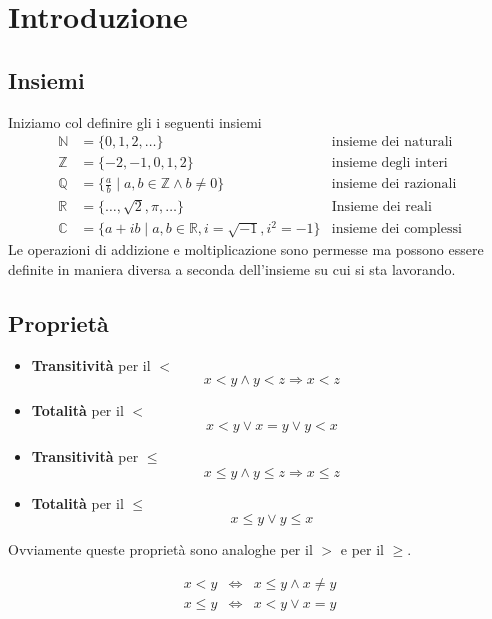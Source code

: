 \chapter{Introduzione}
\section{Insiemi}
Iniziamo col definire gli i seguenti insiemi
\[
	\begin{array}{lll}
		\mathbb{N} & = \{ 0, 1, 2, \dots \}
		           & \text{insieme dei naturali}                                     \\
		\mathbb{Z} & = \{ -2, -1, 0, 1, 2 \}
		           & \text{insieme degli interi}                                     \\
		\mathbb{Q} & = \{ \frac{a}{b} \mid a, b \in \mathbb{Z} \wedge b \neq 0 \}
		           & \text{insieme dei razionali}                                    \\
		\mathbb{R} & = \{ \dots, \sqrt{2}, \pi, \dots \}
		           & \text{Insieme dei reali}                                        \\
		\mathbb{C} & = \{ a + ib \mid a, b \in \mathbb{R}, i = \sqrt{-1}, i^2 = -1\}
		           & \text{insieme dei complessi}
	\end{array}
\]
Le operazioni di addizione e moltiplicazione sono permesse ma possono essere definite in maniera diversa a seconda
dell'insieme su cui si sta lavorando.

\section{Propriet\`a}
\begin{itemize}
	\item \textbf{Transitivit\`a} per il $<$
	      \[ x < y \wedge y < z \Rightarrow x < z \]

	\item \textbf{Totalit\`a} per il $<$
	      \[ x < y \vee x = y \vee y < x \]

	\item \textbf{Transitivit\`a} per $\leq$
	      \[ x \leq y \wedge y \leq z \Rightarrow x \leq z \]

	\item \textbf{Totalit\`a} per il $\leq$
	      \[ x \leq y \vee y \leq x \]
\end{itemize}
Ovviamente queste propriet\`a sono analoghe per il $>$ e per il $\geq$.

\begin{observation}
	\[
		\begin{array}{lll}
			x < y    & \Leftrightarrow & x \leq y \wedge x \neq y \\
			x \leq y & \Leftrightarrow & x < y \vee x = y
		\end{array}
	\]
\end{observation}

